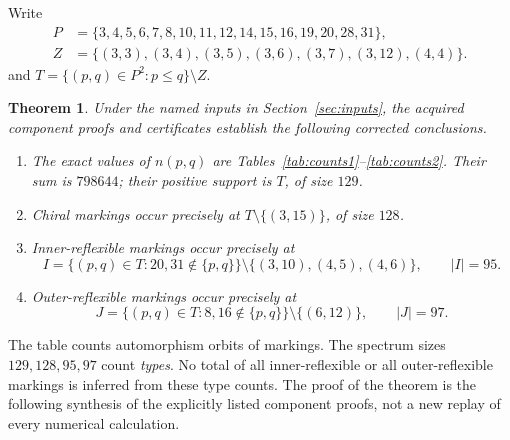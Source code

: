 \documentclass[11pt,a4paper]{article}
\newtheorem{theorem}{Theorem}[section]
\begin{document}
Write
\begin{align*}
 P&=\{3,4,5,6,7,8,10,11,12,14,15,16,19,20,28,31\},\\
 Z&=\{(3,3),(3,4),(3,5),(3,6),(3,7),(3,12),(4,4)\}.
\end{align*}
and $T=\{(p,q)\in P^2:p\leq q\}\setminus Z$.
\begin{theorem}\label{thm:main}
Under the named inputs in Section~\ref{sec:inputs}, the acquired component
proofs and certificates establish the following corrected conclusions.
\begin{enumerate}
\item The exact values of $n(p,q)$ are Tables~\ref{tab:counts1}--\ref{tab:counts2}.
Their sum is $798644$; their positive support is $T$, of size $129$.
\item Chiral markings occur precisely at $T\setminus\{(3,15)\}$, of size $128$.
\item Inner-reflexible markings occur precisely at
\[
 I=\{(p,q)\in T:20,31\notin\{p,q\}\}
       \setminus\{(3,10),(4,5),(4,6)\},\qquad |I|=95.
\]
\item Outer-reflexible markings occur precisely at
\[
 J=\{(p,q)\in T:8,16\notin\{p,q\}\}\setminus\{(6,12)\},
 \qquad |J|=97.
\]
\end{enumerate}
\end{theorem}
The table counts automorphism orbits of markings. The spectrum sizes
$129,128,95,97$ count \emph{types}. No total of all inner-reflexible
or all outer-reflexible markings is inferred from these type counts.
The proof of the theorem is the following synthesis of the explicitly
listed component proofs, not a new replay of every numerical calculation.
\end{document}
